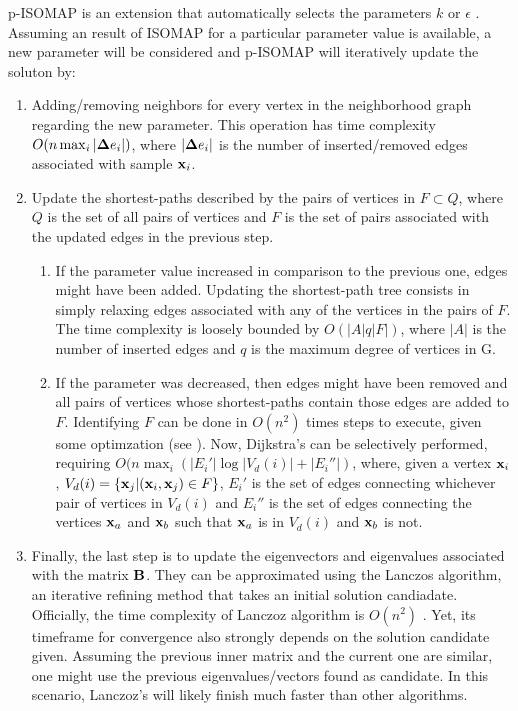 p-ISOMAP is an extension that automatically selects the parameters $k$ or $\epsilon$ \cite{choo2010p}. Assuming an result of ISOMAP for a particular parameter value is available, a new parameter will be considered and p-ISOMAP will iteratively update the soluton by:
\begin{enumerate}
	\item Adding/removing neighbors for every vertex in the neighborhood graph regarding the new parameter. This operation has time complexity $O(n \max_i |\mathbf{\Delta} e_i|)$, where $|\mathbf{\Delta} e_i|$ is the number of inserted/removed edges associated with sample $\mathbf{x}_i$.
	
	\item Update the shortest-paths described by the pairs of vertices in $F \subset Q$, where $Q$ is the set of all pairs of vertices and $F$ is the set of pairs associated with the updated edges in the previous step.
	\begin{enumerate}
		\item If the parameter value increased in comparison to the previous one, edges might have been added. Updating the shortest-path tree consists in simply relaxing edges associated with any of the vertices in the pairs of $F$. The time complexity is loosely bounded by $O(|A|q|F|)$, where $|A|$ is the number of inserted edges and $q$ is the maximum degree of vertices in G.
		
		\item If the parameter was decreased, then edges might have been removed and all pairs of vertices whose shortest-paths contain those edges are added to $F$. Identifying $F$ can be done in $O(n^2)$ times steps to execute, given some optimzation (see \cite{choo2010p}). Now, Dijkstra's can be selectively performed, requiring $O(n \max_i (|E_i'| \log |V_d(i)| + |E_i''|)$, where, given a vertex $\mathbf{x}_i$, $V_d(i)=\{\mathbf{x}_j | (\mathbf{x}_i, \mathbf{x}_j) \in F\}$, $E_i'$ is the set of edges connecting whichever pair of vertices in $V_d(i)$ and $E_i''$ is the set of edges connecting the vertices $\mathbf{x}_a$ and $\mathbf{x}_b$ such that $\mathbf{x}_a$ is in $V_d(i)$ and $\mathbf{x}_b$ is not.
	\end{enumerate}

	\item Finally, the last step is to update the eigenvectors and eigenvalues associated with the matrix $\mathbf{B}$. They can be approximated using the Lanczos algorithm, an iterative refining method that takes an initial solution candiadate. Officially, the time complexity of Lanczoz algorithm is $O(n^2)$ \cite{chen2004machine}. Yet, its timeframe for convergence also strongly depends on the solution candidate given. Assuming the previous inner matrix and the current one are similar, one might use the previous eigenvalues/vectors found as candidate. In this scenario, Lanczoz's will likely finish much faster than other algorithms.
\end{enumerate}

